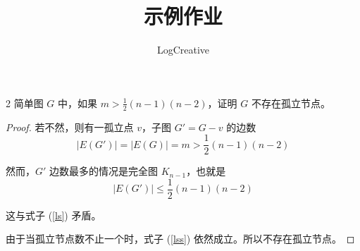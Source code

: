 \documentclass[a4paper,12pt]{article}
\title{示例作业}
\author{LogCreative}
\newenvironment{firstlayer}%
{\begin{list}{}{\renewcommand{\makelabel}[1]{\textbf{##1}.\hfil}
}}
{\end{list}}
\begin{document}
\begin{CJK}{UTF8}{song}

\maketitle

\begin{firstlayer}
  \item[2]简单图 $G$ 中，如果 $m>\frac{1}{2}(n-1)(n-2)$，证明 $G$ 不存在孤立节点。
  \begin{proof}
    若不然，则有一孤立点 $v$，子图 $G'=G-v$ 的边数
    \begin{equation}\label{ls}
      \left\lvert E(G') \right\rvert =\left\lvert E(G)\right\rvert =m>\frac{1}{2}(n-1)(n-2)
    \end{equation}
      
    然而，$G'$ 边数最多的情况是完全图 $K_{n-1}$，也就是
    \begin{equation}\label{lss}
      \left\lvert E(G') \right\rvert  \leq \frac{1}{2}(n-1)(n-2)
    \end{equation}

    这与式子 (\ref{ls}) 矛盾。

    由于当孤立节点数不止一个时，式子 (\ref{lss}) 依然成立。所以不存在孤立节点。

  \end{proof}
\end{firstlayer}

\end{CJK}
\end{document}
